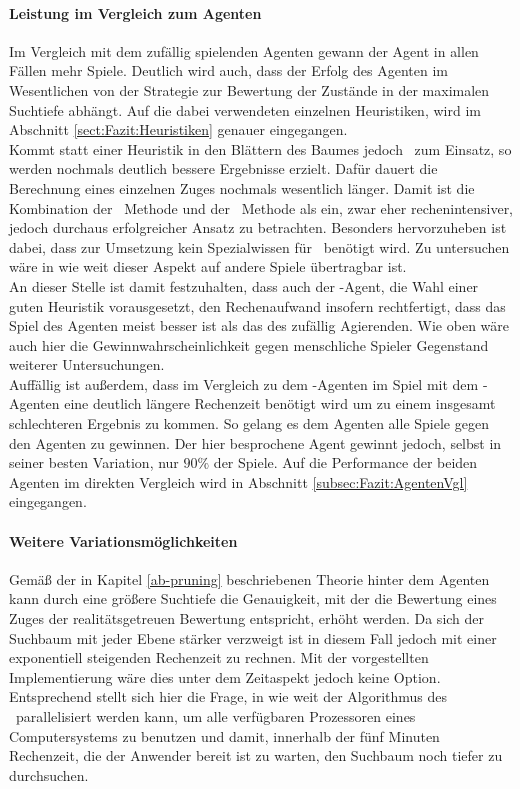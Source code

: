 \paragraph{Leistung im Vergleich zum Agenten }
Im Vergleich mit dem zufällig spielenden Agenten gewann der Agent \mxZitat{\abp} in {\color{red} allen} Fällen mehr Spiele. Deutlich wird auch, dass der Erfolg des Agenten im Wesentlichen von der Strategie zur Bewertung der Zustände in der maximalen Suchtiefe abhängt. Auf die dabei verwendeten einzelnen Heuristiken, wird im Abschnitt \ref{sect:Fazit:Heuristiken} genauer eingegangen.
\\{\color{red}Kommt statt einer Heuristik in den Blättern des Baumes jedoch \mc\ zum Einsatz, so werden nochmals deutlich bessere Ergebnisse erzielt. Dafür dauert die Berechnung eines einzelnen Zuges nochmals wesentlich länger. Damit ist die Kombination der \ababs\ Methode und der \mc\ Methode als ein, zwar eher rechenintensiver, jedoch durchaus erfolgreicher Ansatz zu betrachten. Besonders hervorzuheben ist dabei, dass zur Umsetzung kein Spezialwissen für \ot\ benötigt wird. Zu untersuchen wäre in wie weit dieser Aspekt auf andere Spiele übertragbar ist.}
\\An dieser Stelle ist damit festzuhalten, dass auch der \mxZitat{\abp}-Agent, die Wahl einer guten Heuristik vorausgesetzt, den Rechenaufwand insofern rechtfertigt, dass das Spiel des Agenten meist besser ist als das des zufällig Agierenden. Wie oben wäre auch hier die Gewinnwahrscheinlichkeit gegen menschliche Spieler Gegenstand weiterer Untersuchungen.
\\Auffällig ist außerdem, dass im Vergleich zu dem \mxZitat{\mc}-Agenten im Spiel mit dem -Agenten eine deutlich längere Rechenzeit benötigt wird um zu einem insgesamt schlechteren Ergebnis zu kommen. So gelang es dem Agenten \mxZitat{\mc} alle Spiele gegen den Agenten  zu gewinnen. {\color{red} Der hier besprochene Agent gewinnt jedoch, selbst in seiner besten Variation, nur $90\%$ der Spiele.} Auf die Performance der beiden Agenten im direkten Vergleich wird in Abschnitt \ref{subsec:Fazit:AgentenVgl} eingegangen.
\paragraph{Weitere Variationsmöglichkeiten}
Gemäß der in Kapitel \ref{ab-pruning} beschriebenen Theorie hinter dem Agenten \mxZitat{\abp} kann durch eine größere Suchtiefe  die Genauigkeit, mit der die Bewertung eines Zuges der realitätsgetreuen Bewertung entspricht, erhöht werden. Da sich der Suchbaum mit jeder Ebene stärker verzweigt ist in diesem Fall jedoch mit einer exponentiell steigenden Rechenzeit zu rechnen. Mit der vorgestellten Implementierung wäre dies unter dem Zeitaspekt jedoch keine Option. Entsprechend stellt sich hier die Frage, in wie weit der Algorithmus des \ababs\ parallelisiert werden kann, um alle verfügbaren Prozessoren eines Computersystems zu benutzen und damit, innerhalb der fünf Minuten Rechenzeit, die der Anwender bereit ist zu warten, den Suchbaum noch tiefer zu durchsuchen.


